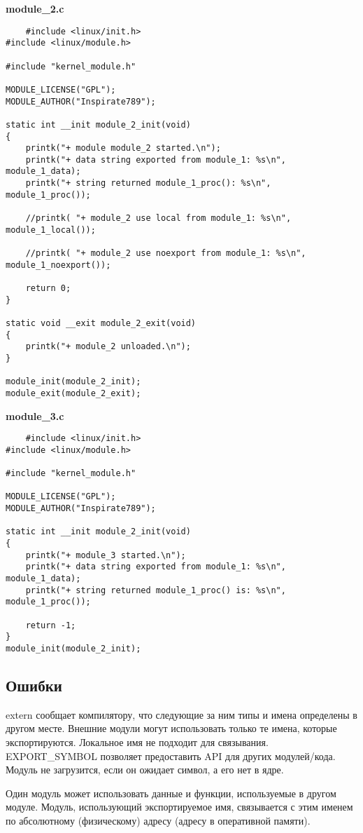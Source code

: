 \textbf{module\_2.c}
\begin{lstlisting}
    #include <linux/init.h>
#include <linux/module.h>

#include "kernel_module.h"

MODULE_LICENSE("GPL");
MODULE_AUTHOR("Inspirate789");

static int __init module_2_init(void)
{
    printk("+ module module_2 started.\n");
    printk("+ data string exported from module_1: %s\n", module_1_data);
    printk("+ string returned module_1_proc(): %s\n", module_1_proc());

    //printk( "+ module_2 use local from module_1: %s\n", module_1_local());

    //printk( "+ module_2 use noexport from module_1: %s\n", module_1_noexport());

    return 0;
}

static void __exit module_2_exit(void)
{
    printk("+ module_2 unloaded.\n");
}

module_init(module_2_init);
module_exit(module_2_exit);
\end{lstlisting}

\textbf{module\_3.c}
\begin{lstlisting}
    #include <linux/init.h>
#include <linux/module.h>

#include "kernel_module.h"

MODULE_LICENSE("GPL");
MODULE_AUTHOR("Inspirate789");

static int __init module_2_init(void)
{
    printk("+ module_3 started.\n");
    printk("+ data string exported from module_1: %s\n", module_1_data);
    printk("+ string returned module_1_proc() is: %s\n", module_1_proc());

    return -1;
}
module_init(module_2_init);
\end{lstlisting}

\subsection{Ошибки}
extern сообщает компилятору, что следующие за ним типы и имена определены в другом месте. Внешние модули могут использовать только те имена, которые экспортируются. Локальное имя не подходит для связывания. \\ EXPORT\_SYMBOL позволяет предоставить API для других модулей/кода. Модуль не загрузится, если он ожидает символ, а его нет в ядре.

Один модуль может использовать данные и функции, используемые в другом модуле. Модуль, использующий экспортируемое имя, связывается с этим именем по абсолютному (физическому) адресу (адресу в оперативной памяти).

